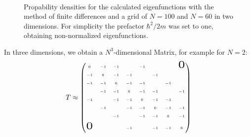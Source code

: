 \documentclass[10pt,a4paper]{article} %
\begin{document}
\begin{figure}[!htb]
	\Huge
	\hspace*{-1.5in}
	\centering
	\subfigure[Color map, $\psi_{12}$, $N=60$.]
		{\resizebox{!}{0.38\textwidth}{}\label{fig:2d_eigenfunction}}
	\\
	\caption{Propability densities for the calculated eigenfunctions with the method of finite differences and a grid of $N=100$ and $N=60$ in two dimensions. For simplicity the prefactor $\hbar^2 /2m$ was set to one, obtaining non-normalized eigenfunctions.}
	\label{Aufbauskizze}
\end{figure}



In three dimensions, we obtain a $N^3$-dimensional Matrix, for example for $N=2$:
\begin{align*}
T \approx
\tiny
\begin{pmatrix}
 6 & -1 & -1 &  & -1 &  &  & \scalebox{3}{$0$}  \\\\
   -1 & 6 & -1 & -1 &  & -1 &  & \\\\
     -1 & -1 & 6 & -1 & -1 &  & -1 & \\\\
        & -1 & -1 & 6 & -1 & -1 &  & -1\\\\
        -1 &  & -1 & -1 & 6 & -1 & -1 & \\\\
           & -1 &  & -1 & -1 & 6 & -1 & -1\\\\
             &  & -1 &  & -1 & -1 & 6 & -1\\\\
              \scalebox{3}{$0$}  &  &  & -1 &  & -1 & -1 & 6\\\\
              \end{pmatrix}
\end{align*}
\end{document}
